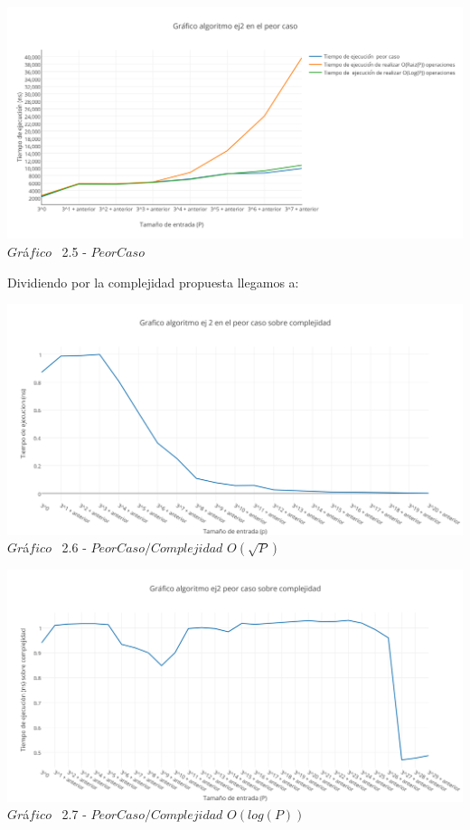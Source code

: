 \vspace*{0.3cm} \vspace*{0.3cm}
  \begin{center}
 \includegraphics[scale=0.65]{./EJ2/peorcaso.png}
 {$Gr$\'a$fico$ \ 2.5 - $Peor Caso$}
  \end{center}
  \vspace*{0.3cm}


Dividiendo por la complejidad propuesta llegamos a:\\

\vspace*{0.3cm} \vspace*{0.3cm}
  \begin{center}
 \includegraphics[scale=0.65]{./EJ2/peorcaso1.png}
 {$Gr$\'a$fico$ \ 2.6 - $Peor Caso / Complejidad$ $O(\sqrt{P})$}
  \end{center}
  \vspace*{0.3cm}

\vspace*{0.3cm} \vspace*{0.3cm}
  \begin{center}
 \includegraphics[scale=0.65]{./EJ2/peorcaso2.png}
 {$Gr$\'a$fico$ \ 2.7 - $Peor Caso / Complejidad$ $O(log(P))$}
  \end{center}
  \vspace*{0.3cm}

